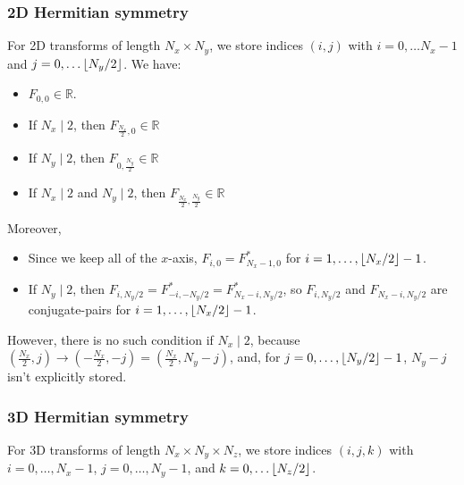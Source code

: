 \documentclass[12pt]{article}
\DeclarePairedDelimiter\floor{\lfloor}{\rfloor}
\renewcommand{\(}{\left(}
\renewcommand{\)}{\right)}
\begin{document}
\subsubsection{2D Hermitian symmetry}
For 2D transforms of length $N_x\times{}N_y$, we store indices $(i,j)$ with
$i=0,\dots{}N_x-1$ and $j=0,\dots{}\floor{N_y/2}$.  We have:
\begin{itemize}
\item $F_{0,0}\in\mathbb{R}$.
\item If $N_x\mid 2$, then $F_{\frac{N_x}{2},0}\in\mathbb{R}$
\item If $N_y\mid 2$, then $F_{0,\frac{N_y}{2}}\in\mathbb{R}$
\item If $N_x\mid 2$ and $N_y\mid 2$, then
  $F_{\frac{N_x}{2},\frac{N_y}{2}}\in\mathbb{R}$
\end{itemize}
Moreover,
\begin{itemize}
\item Since we keep all of the $x$-axis, $F_{i,0}=F^*_{N_x-1,0}$ for
  $i=1,\dots,\floor{N_x/2}-1$.
\item If $N_y\mid 2$, then
  $F_{i,N_y/2}=F^*_{-i,-N_y/2}=F^*_{N_x-i,N_y/2}$, so $F_{i,N_y/2}$
  and $F_{N_x-i,N_y/2}$ are conjugate-pairs for
  $i=1,\dots,\floor{N_x/2}-1$.
\end{itemize}
However, there is no such condition if $N_x\mid 2$, because
$(\frac{N_x}{2},j)\rightarrow(-\frac{N_x}{2},-j)=(\frac{N_x}{2},N_y-j)$,
and, for $j=0,\dots{},\floor{N_y/2}-1$, $N_y-j$ isn't explicitly
stored.

\subsubsection{3D Hermitian symmetry}

For 3D transforms of length $N_x\times{}N_y\times{}N_z$, we store
indices $(i,j,k)$ with $i=0,\dots,N_x-1$, $j=0,\dots,N_y-1$, and
$k=0,\dots\floor{N_z/2}$.
\end{document}
